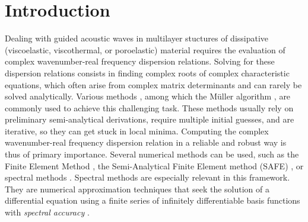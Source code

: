 \section{Introduction}
Dealing with guided acoustic waves in multilayer stuctures of dissipative (viscoelastic, viscothermal, or poroelastic) material  requires the evaluation of complex wavenumber-real frequency dispersion relations. Solving for these dispersion relations consists in finding complex roots of complex characteristic equations, which often arise from complex matrix determinants and can rarely be solved analytically. Various methods \cite{ kowalczyk2017, dubbelday1983}, among which the Müller algorithm \cite{muller1956}, are commonly used to achieve this challenging task. These methods usually rely on preliminary semi-analytical derivations, require multiple initial guesses, and are iterative, so they can get stuck in local minima. Computing the complex wavenumber-real frequency dispersion relation in a reliable and robust way is thus of primary importance. Several numerical methods can be used, such as the Finite Element Method \cite{treyssede2014}, the Semi-Analytical Finite Element method (SAFE) \cite{bartoli2006, marzani2008,rose2014}, or spectral methods \cite{canuto2006}. Spectral methods are especially relevant in this framework. They are numerical approximation techniques that seek the solution of a differential equation using a finite series of infinitely differentiable basis functions with \emph{spectral accuracy} \cite{trefethen2000}.
    
